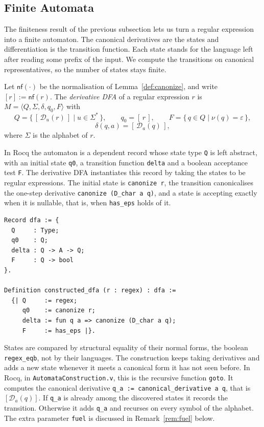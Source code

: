 \subsection{Finite Automata}\label{sec:dfa}

The finiteness result of the previous subsection lets us turn a regular
expression into a finite automaton. The canonical derivatives are the states
and differentiation is the transition function. Each state stands for the
language left after reading some prefix of the input. We compute the
transitions on canonical representatives, so the number of states stays
finite.

\begin{definition}\label{def:deriv-dfa}
Let $\mathsf{nf}(\cdot)$ be the normalisation of Lemma~\ref{def:canonize}, and write
$[r]:=\mathsf{nf}(r)$. The \emph{derivative DFA} of a regular expression $r$ is $M=\langle Q,\Sigma,\delta,q_0,F\rangle$ with
\[
  Q=\{\,[\,\mathcal{D}_u(r)\,]\mid u\in\Sigma^{*}\,\},\qquad
  q_0=[\,r\,],\qquad
  F=\{\,q\in Q\mid \nu(q)=\varepsilon\,\},
\]
\[
  \delta(q,a)=[\,\mathcal{D}_a(q)\,],
\]
where $\Sigma$ is the alphabet of $r$.
\end{definition}

In Rocq the automaton is a dependent record whose state type \texttt{Q} is left
abstract, with an initial state \texttt{q0}, a transition function \texttt{delta}
and a boolean acceptance test \texttt{F}. The derivative DFA instantiates this
record by taking the states to be regular expressions. The initial state is
\texttt{canonize r}, the transition canonicalises the one-step derivative
\texttt{canonize (D\_char a q)}, and a state is accepting exactly when it is
nullable, that is, when \texttt{has\_eps} holds of it.

\begin{lstlisting}[style=rocqstyle,caption={The DFA record and the constructed derivative DFA (\texttt{Automata.v}).},label={lst:dfadef}]
Record dfa := {
  Q     : Type;
  q0    : Q;
  delta : Q -> A -> Q;
  F     : Q -> bool
}.

Definition constructed_dfa (r : regex) : dfa :=
  {| Q     := regex;
     q0    := canonize r;
     delta := fun q a => canonize (D_char a q);
     F     := has_eps |}.
\end{lstlisting}

States are compared by structural equality of their normal forms, the boolean
\texttt{regex\_eqb}, not by their languages. The construction keeps taking
derivatives and adds a new state whenever it meets a canonical form it has not seen
before. In Rocq, in \texttt{AutomataConstruction.v}, this is the recursive function
\texttt{goto}. It computes the canonical derivative
\texttt{q\_a := canonical\_derivative a q}, that is $[\mathcal{D}_a(q)]$. If
\texttt{q\_a} is already among the discovered states it records the transition.
Otherwise it adds \texttt{q\_a} and recurses on every symbol of the alphabet. The
extra parameter \texttt{fuel} is discussed in Remark~\ref{rem:fuel} below.

